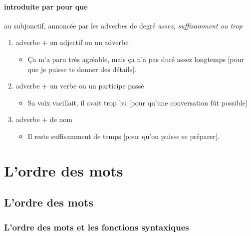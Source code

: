\documentclass[UTF8]{report}
\begin{document}
\subsubsection{introduite par pour que}
au subjonctif, annoncée par les adverbes de degré \textit{assez, suffisamment ou trop}
\begin{enumerate}
    \item adverbe + un adjectif ou un adverbe
    \begin{itemize}
        \item Ça m’a paru très agréable, mais ça n’a pas duré assez longtemps [pour que je puisse te donner des détails].
    \end{itemize}
    \item adverbe + un verbe ou un participe passé 
    \begin{itemize}
        \item Sa voix vacillait, il avait trop bu [pour qu’une conversation fût possible]
    \end{itemize}
    \item adverbe + de nom
    \begin{itemize}
        \item Il reste suffisamment de temps [pour qu’on puisse se préparer].
    \end{itemize}
\end{enumerate}



\chapter{L’ordre des mots}
\section{L’ordre des mots}
\subsection{L’ordre des mots et les fonctions syntaxiques}
\end{document}
